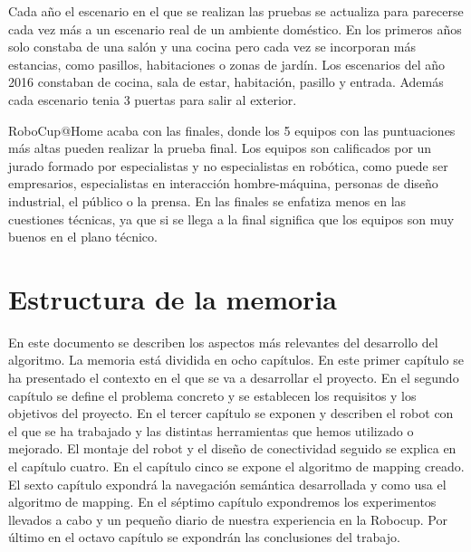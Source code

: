 Cada año el escenario en el que se realizan las pruebas se actualiza para parecerse cada vez más a un escenario real de un ambiente doméstico. En los primeros años solo constaba de una salón y una cocina pero cada vez se incorporan más estancias, como pasillos, habitaciones o zonas de jardín. Los escenarios del año 2016 constaban de cocina, sala de estar, habitación, pasillo y entrada. Además cada escenario tenia 3 puertas para salir al exterior.

RoboCup@Home acaba con las finales, donde los 5 equipos con las puntuaciones más altas pueden realizar la prueba final. Los equipos son calificados por un jurado formado por especialistas y no especialistas en robótica, como puede ser empresarios, especialistas en interacción hombre-máquina, personas de diseño industrial, el público o la prensa. En las finales se enfatiza menos en las cuestiones técnicas, ya que si se llega a la final significa que los equipos son muy buenos en el plano técnico.

\section{Estructura de la memoria}
\label{cap:estructuradelamemoria}
En este documento se describen los aspectos más relevantes del desarrollo del algoritmo. La memoria está dividida en ocho capítulos. En este primer capítulo se ha presentado el contexto en el que se va a desarrollar el proyecto. En el segundo capítulo se define el problema concreto y se establecen los requisitos y los objetivos del proyecto. En el tercer capítulo se exponen y describen el robot con el que se ha trabajado y las distintas herramientas que hemos utilizado o mejorado. El montaje del robot y el diseño de conectividad seguido se explica en el capítulo cuatro. En el capítulo cinco se expone el algoritmo de mapping creado. El sexto capítulo expondrá la navegación semántica desarrollada y como usa el algoritmo de mapping. En el séptimo capítulo expondremos los experimentos llevados a cabo y un pequeño diario de nuestra experiencia en la Robocup. Por último en el octavo capítulo se expondrán las conclusiones del trabajo.
